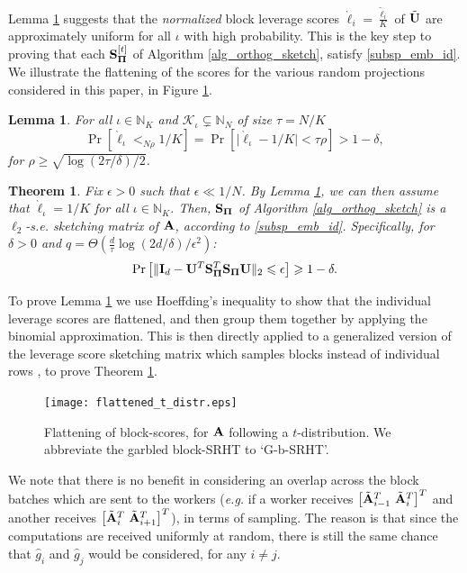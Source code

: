 \documentclass[journal,letterpaper,onecolumn,twoside,nofonttune]{IEEEtran}
\newcommand{\K}{\mathcal{K}}
\newcommand{\Ub}{\bold{U}}
\newcommand{\ellg}{\grave{\ell}}
\newcommand{\ellt}{\tilde{\ell}}
\newcommand{\Pibold}{\bold{\Pi}}
\newcommand{\N}{\mathbb{N}}
\newcommand{\gh}{\hat{g}}
\newcommand{\Sb}{\bold{S}}
\newcommand{\SbPi}{\Sb_{\Pibold}}
\newcommand{\Ab}{\bold{A}}
\newcommand{\Abt}{{\tilde{\bold{A}}}}
\newcommand{\Ib}{\bold{I}}
\newcommand{\Ubt}{\tilde{\bold{U}}}
\newtheorem{Thm}{Theorem}
\newtheorem{Lemma}{Lemma}
\begin{document}
Lemma \ref{bd_block_lvg_Unif} suggests that the \textit{normalized} block leverage scores $\ellg_i=\frac{\ellt_i}{K}$ of $\Ubt$ are approximately uniform for all $\iota$ with high probability. This is the key step to proving that each $\SbPi^{[t]}$ of Algorithm \ref{alg_orthog_sketch}, satisfy \eqref{subsp_emb_id}. We illustrate the flattening of the scores for the various random projections considered in this paper, in Figure \ref{flattening_t_distr}.

\begin{Lemma}
\label{bd_block_lvg_Unif}
  For all $\iota\in\N_K$ and $\K_\iota\subsetneq\N_N$ of size $\tau=N/K$
  $$ \Pr\left[\ellg_\iota<_{N\rho}1/K\right] = \Pr\left[\big|\ellg_\iota-1/K\big|<\tau\rho\right] > 1-\delta, $$
  for $\rho\geqslant\sqrt{\log(2\tau/\delta)/2}$.
\end{Lemma}

\begin{Thm}
\label{subsp_emb_thm_Unif}
Fix $\epsilon>0$ such that $\epsilon\ll1/N$. By Lemma \ref{bd_block_lvg_Unif}, we can then assume that $\ellg_\iota=1/K$ for all $\iota\in\N_K$. Then, $\SbPi$ of Algorithm \ref{alg_orthog_sketch} is a $\ell_2$-s.e. sketching matrix of $\Ab$, according to \eqref{subsp_emb_id}. Specifically, for $\delta>0$ and $q=\Theta\left(\frac{d}{\tau}\log{(2d/\delta)}/\epsilon^2\right)$:
\begin{equation*}
  \Pr\big[\|\Ib_d-\Ub^T\SbPi^T\SbPi \Ub\|_2\leqslant\epsilon\big]\geqslant 1-\delta.
\end{equation*}
\end{Thm}

To prove Lemma \ref{bd_block_lvg_Unif} we use Hoeffding’s inequality to show that the individual leverage scores are flattened, and then group them together by applying the binomial approximation. This is then directly applied to a generalized version of the leverage score sketching matrix which samples blocks instead of individual rows \cite[Theorem 1]{CPH23b}, to prove Theorem \ref{subsp_emb_thm_Unif}.

\begin{figure}[h]
  \centering
    \texttt{[image: flattened\_t\_distr.eps]}
    \caption{Flattening of block-scores, for $\Ab$ following a $t$-distribution. We abbreviate the garbled block-SRHT to `G-b-SRHT'.}
  \label{flattening_t_distr}
\end{figure}

We note that there is no benefit in considering an overlap across the block batches which are sent to the workers (\textit{e.g.} if a worker receives $\big[\Abt_{i-1}^T\ \Abt_i^T\big]^T$ and another receives $\big[\Abt_i^T\ \Abt_{i+1}^T\big]^T$), in terms of sampling. The reason is that since the computations are received uniformly at random, there is still the same chance that $\gh_i$ and $\gh_j$ would be considered, for any $i\neq j$.
\end{document}

